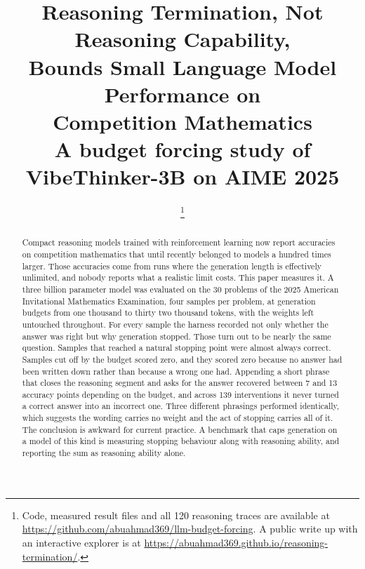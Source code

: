 \documentclass[conference]{IEEEtran}
\begin{document}
\title{Reasoning Termination, Not Reasoning Capability,\\
Bounds Small Language Model Performance on\\
Competition Mathematics\\
{\footnotesize A budget forcing study of VibeThinker-3B on AIME 2025}
}

\author{
\thanks{Code, measured result files and all 120 reasoning traces are available at
\protect\url{https://github.com/abuahmad369/llm-budget-forcing}. A public write up
with an interactive explorer is at
\protect\url{https://abuahmad369.github.io/reasoning-termination/}.}
}

\maketitle

\begin{abstract}
Compact reasoning models trained with reinforcement learning now report
accuracies on competition mathematics that until recently belonged to models a
hundred times larger. Those accuracies come from runs where the generation
length is effectively unlimited, and nobody reports what a realistic limit
costs. This paper measures it. A three billion parameter model was evaluated on
the 30 problems of the 2025 American Invitational Mathematics Examination, four
samples per problem, at generation budgets from one thousand to thirty two
thousand tokens, with the weights left untouched throughout. For every sample
the harness recorded not only whether the answer was right but why generation
stopped. Those turn out to be nearly the same question. Samples that reached a
natural stopping point were almost always correct. Samples cut off by the budget
scored zero, and they scored zero because no answer had been written down rather
than because a wrong one had. Appending a short phrase that closes the reasoning
segment and asks for the answer recovered between 7 and 13 accuracy points
depending on the budget, and across 139 interventions it never turned a correct
answer into an incorrect one. Three different phrasings performed identically,
which suggests the wording carries no weight and the act of stopping carries
all of it. The conclusion is awkward for current practice. A benchmark that
caps generation on a model of this kind is measuring stopping behaviour along
with reasoning ability, and reporting the sum as reasoning ability alone.
\end{abstract}
\end{document}
